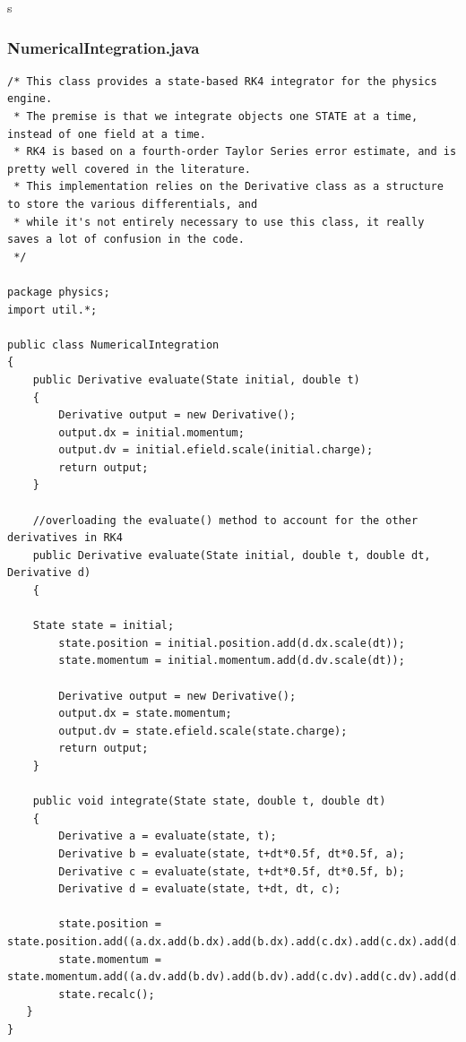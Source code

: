 s\documentclass[10pt]{article}
\begin{document}
\subsubsection{NumericalIntegration.java}
\begin{verbatim}
/* This class provides a state-based RK4 integrator for the physics engine. 
 * The premise is that we integrate objects one STATE at a time, instead of one field at a time.
 * RK4 is based on a fourth-order Taylor Series error estimate, and is pretty well covered in the literature.
 * This implementation relies on the Derivative class as a structure to store the various differentials, and
 * while it's not entirely necessary to use this class, it really saves a lot of confusion in the code.
 */

package physics;
import util.*;

public class NumericalIntegration
{	
	public Derivative evaluate(State initial, double t)
	{
		Derivative output = new Derivative();
		output.dx = initial.momentum;
		output.dv = initial.efield.scale(initial.charge);
		return output;
	}
	
	//overloading the evaluate() method to account for the other derivatives in RK4	
	public Derivative evaluate(State initial, double t, double dt, Derivative d)
	{

	State state = initial;
	    state.position = initial.position.add(d.dx.scale(dt));
	    state.momentum = initial.momentum.add(d.dv.scale(dt)); 

	    Derivative output = new Derivative();
	    output.dx = state.momentum;
	    output.dv = state.efield.scale(state.charge);
	    return output;
	}
	
	public void integrate(State state, double t, double dt)
    {
        Derivative a = evaluate(state, t);      
        Derivative b = evaluate(state, t+dt*0.5f, dt*0.5f, a);
        Derivative c = evaluate(state, t+dt*0.5f, dt*0.5f, b);
        Derivative d = evaluate(state, t+dt, dt, c);

        state.position = state.position.add((a.dx.add(b.dx).add(b.dx).add(c.dx).add(c.dx).add(d.dx)).scale(dt/6));
        state.momentum = state.momentum.add((a.dv.add(b.dv).add(b.dv).add(c.dv).add(c.dv).add(d.dv)).scale(dt/6));
        state.recalc();    
   }
}
\end{verbatim}
\end{document}
